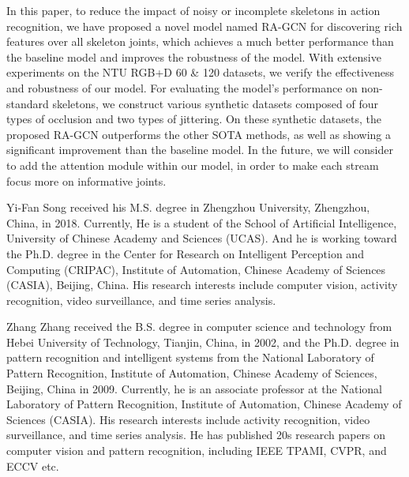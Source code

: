 \documentclass[journal]{IEEEtran}
\begin{document}
In this paper, to reduce the impact of noisy or incomplete skeletons in action recognition, we have proposed a novel model named RA-GCN for discovering rich features over all skeleton joints, which achieves a much better performance than the baseline model and improves the robustness of the model. With extensive experiments on the NTU RGB+D 60 \& 120 datasets, we verify the effectiveness and robustness of our model. For evaluating the model's performance on non-standard skeletons, we construct various synthetic datasets composed of four types of occlusion and two types of jittering. On these synthetic datasets, the proposed RA-GCN outperforms the other SOTA methods, as well as showing a significant improvement than the baseline model. In the future, we will consider to add the attention module within our model, in order to make each stream focus more on informative joints.

{\small
    
    
}

\begin{IEEEbiography}{Yi-Fan Song}
received his M.S. degree in Zhengzhou University, Zhengzhou, China, in 2018. Currently, He is a student of the School of Artificial Intelligence, University of Chinese Academy and Sciences (UCAS). And he is working toward the Ph.D. degree in the Center for Research on Intelligent Perception and Computing (CRIPAC), Institute of Automation, Chinese Academy of Sciences (CASIA), Beijing, China. His research interests include computer vision, activity recognition, video surveillance, and time series analysis.
\end{IEEEbiography}

\begin{IEEEbiography}{Zhang Zhang}
received the B.S. degree in computer science and technology from Hebei University of Technology, Tianjin, China, in 2002, and the Ph.D. degree in pattern recognition and intelligent systems from the National Laboratory of Pattern Recognition, Institute of Automation, Chinese Academy of Sciences, Beijing, China in 2009. Currently, he is an associate professor at the National Laboratory of Pattern Recognition, Institute of Automation, Chinese Academy of Sciences (CASIA). His research interests include activity recognition, video surveillance, and time series analysis. He has published 20s research papers on computer vision and pattern recognition, including IEEE TPAMI, CVPR, and ECCV etc.
\end{IEEEbiography}
\end{document}
